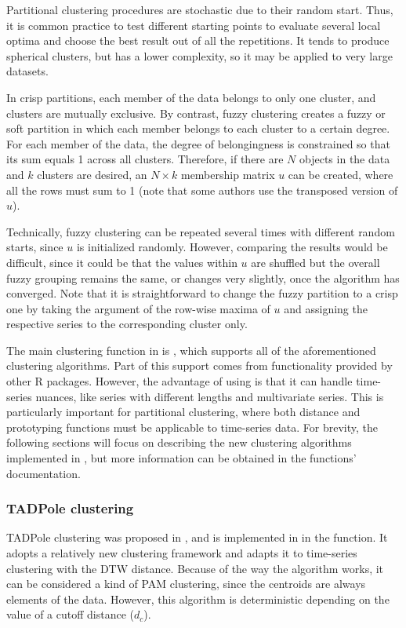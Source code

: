 Partitional clustering procedures are stochastic due to their random start.
Thus, it is common practice to test different starting points to evaluate several local optima and choose the best result out of all the repetitions.
It tends to produce spherical clusters,
but has a lower complexity,
so it may be applied to very large datasets.

In crisp partitions,
each member of the data belongs to only one cluster,
and clusters are mutually exclusive.
By contrast,
fuzzy clustering creates a fuzzy or soft partition in which each member belongs to each cluster to a certain degree.
For each member of the data, the degree of belongingness is constrained so that its sum equals 1 across all clusters.
Therefore, if there are $N$ objects in the data and $k$ clusters are desired,
an $N \times k$ membership matrix $u$ can be created,
where all the rows must sum to 1
(note that some authors use the transposed version of $u$).

Technically, fuzzy clustering can be repeated several times with different random starts,
since $u$ is initialized randomly.
However, comparing the results would be difficult,
since it could be that the values within $u$ are shuffled but the overall fuzzy grouping remains the same,
or changes very slightly,
once the algorithm has converged.
Note that it is straightforward to change the fuzzy partition to a crisp one by taking the argument of the row-wise maxima of $u$ and assigning the respective series to the corresponding cluster only.

The main clustering function in \dtwclust{} is ,
which supports all of the aforementioned clustering algorithms.
Part of this support comes from functionality provided by other R packages.
However, the advantage of using \dtwclust{} is that it can handle time-series nuances,
like series with different lengths and multivariate series.
This is particularly important for partitional clustering,
where both distance and prototyping functions must be applicable to time-series data.
For brevity, the following sections will focus on describing the new clustering algorithms implemented in \dtwclust{},
but more information can be obtained in the functions' documentation.

\subsubsection{TADPole clustering}
\label{sec:tadpole}

TADPole clustering was proposed in \citet{begum2015},
and is implemented in \dtwclust{} in the  function.
It adopts a relatively new clustering framework and adapts it to time-series clustering with the DTW distance.
Because of the way the algorithm works,
it can be considered a kind of PAM clustering,
since the centroids are always elements of the data.
However, this algorithm is deterministic depending on the value of a cutoff distance ($d_c$).

